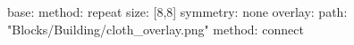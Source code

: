 base:
  method: repeat
  size: [8,8]
  symmetry: none
overlay:
  path: "Blocks/Building/cloth_overlay.png"
  method: connect
